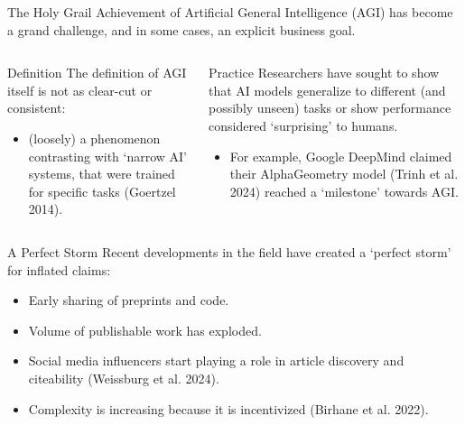\documentclass[
  10pt,
  ignorenonframetext,
  aspectratio=169,
  notheorems]{beamer}
\providecommand{\tightlist}{%
  \setlength{\itemsep}{0pt}\setlength{\parskip}{0pt}}\usepackage{longtable,booktabs,array}
\begin{document}
\begin{frame}{The Holy Grail}
\label{the-holy-grail}
Achievement of Artificial General Intelligence (AGI) has become a grand
challenge, and in some cases, an explicit business goal.

\begin{columns}[T]
\begin{column}{0.5\textwidth}
\begin{block}{Definition}
\label{definition}
The definition of AGI itself is not as clear-cut or consistent:

\begin{itemize}
\tightlist
\item
  (loosely) a phenomenon contrasting with `narrow AI' systems, that were
  trained for specific tasks (Goertzel 2014).
\end{itemize}
\end{block}
\end{column}

\begin{column}{0.5\textwidth}
\begin{block}{Practice}
\label{practice}
Researchers have sought to show that AI models generalize to different
(and possibly unseen) tasks or show performance considered `surprising'
to humans.

\begin{itemize}
\tightlist
\item
  For example, Google DeepMind claimed their AlphaGeometry model (Trinh
  et al. 2024) reached a `milestone' towards AGI.
\end{itemize}
\end{block}
\end{column}
\end{columns}
\end{frame}

\begin{frame}{A Perfect Storm}
\label{a-perfect-storm}
Recent developments in the field have created a `perfect storm' for
inflated claims:

\begin{itemize}[<+->]
\tightlist
\item
  Early sharing of preprints and code.
\item
  Volume of publishable work has exploded.
\item
  Social media influencers start playing a role in article discovery and
  citeability (Weissburg et al. 2024).
\item
  Complexity is increasing because it is incentivized (Birhane et al.
  2022).
\end{itemize}
\end{frame}
\end{document}
